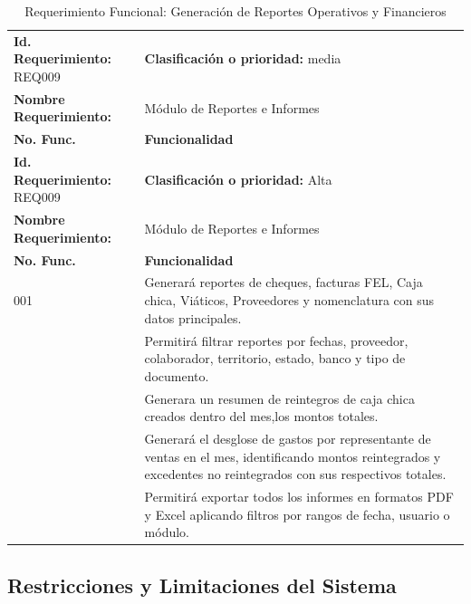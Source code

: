 {
\small
{}
\setlength{\parindent}{0pt}
\begin{xltabular}{\linewidth}{
    >{\raggedright\arraybackslash}p{4.2cm} 
    >{\raggedright\arraybackslash}X
}

    \caption{Requerimiento Funcional: Generación de Reportes Operativos y Financieros} \label{tab:req009_reportes} \\
    \toprule
    \textbf{Id. Requerimiento:} REQ009 & \textbf{Clasificación o prioridad:} media \\
    \textbf{Nombre Requerimiento:} & Módulo de Reportes e Informes  \\
    \textbf{No. Func.} & \textbf{Funcionalidad} \\
    \midrule
    \endfirsthead

    \toprule
    \textbf{Id. Requerimiento:} REQ009 & \textbf{Clasificación o prioridad:} Alta \\
    \textbf{Nombre Requerimiento:} & Módulo de Reportes e Informes  \\
    \textbf{No. Func.} & \textbf{Funcionalidad} \\
    \midrule
    \endhead

    \endfoot

    \bottomrule
\endlastfoot

    001 & Generará reportes de cheques, facturas FEL, Caja chica, Viáticos, Proveedores y nomenclatura con sus datos principales. \\
     & Permitirá filtrar reportes por fechas, proveedor, colaborador, territorio, estado, banco y tipo de documento. \\
     & Generara un resumen de reintegros de caja chica creados dentro del mes,los montos totales. \\
     & Generará el desglose de gastos por representante de ventas en el mes, identificando montos reintegrados y excedentes no reintegrados con sus respectivos totales. \\
     & Permitirá exportar todos los informes en formatos PDF y Excel aplicando filtros por rangos de fecha, usuario o módulo. \\
\end{xltabular}
}
\subsection{Restricciones y Limitaciones del Sistema}

